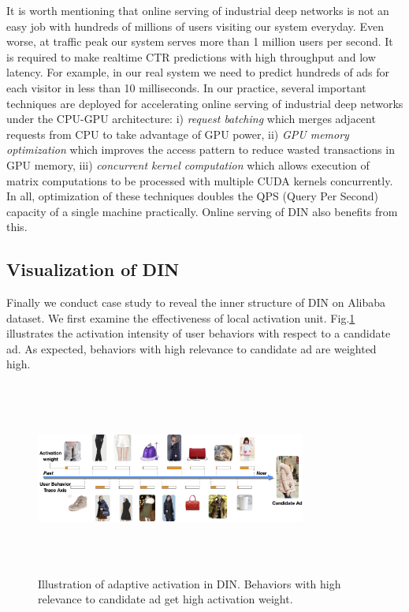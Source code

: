 It is worth mentioning that online serving of industrial deep networks is not an easy job with hundreds of millions of users visiting our system everyday. Even worse, at traffic peak our system serves more than 1 million users per second. It is required to make realtime CTR predictions with high throughput and low latency. For example, in our real system we need to predict hundreds of ads for each visitor in less than 10 milliseconds.  
In our practice, several important techniques are deployed for accelerating online serving of industrial deep networks under the CPU-GPU architecture:  
i) \textsl{request batching} which merges adjacent requests from CPU to take advantage of GPU power,
ii) \textsl{GPU memory optimization} which improves the access pattern to reduce wasted transactions in GPU memory,
iii) \textsl{concurrent kernel computation} which allows execution of matrix computations to be processed with multiple CUDA kernels concurrently.           
In all, optimization of these techniques doubles the QPS (Query Per Second) capacity of a single machine practically. 
Online serving of DIN also benefits from this. 


\subsection{Visualization of DIN}
\label{visual_din}
Finally we conduct case study to reveal the inner structure of DIN on Alibaba dataset.
We first examine the effectiveness of local activation unit. 
Fig.\ref{fig:att_case} illustrates the activation intensity of user behaviors with respect to a candidate ad.
As expected, behaviors with high relevance to candidate ad are weighted high.


\begin{figure}[!h]
\centering
\includegraphics[height=2.5in, width=3.5in, keepaspectratio]{images/omni/attention_timeline_fix.png}
\caption{Illustration of adaptive activation in DIN. Behaviors with high relevance to candidate ad get high activation weight. }
\label{fig:att_case}
\end{figure}


